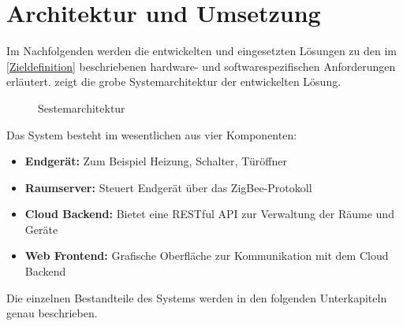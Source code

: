 \section{Architektur und Umsetzung}

Im Nachfolgenden werden die entwickelten und eingesetzten Lösungen zu den im \autoref{Zieldefinition} beschriebenen hardware- und softwarespezifischen Anforderungen erläutert.  zeigt
die grobe Systemarchitektur der entwickelten Lösung.


\begin{figure}[htb]
\centering
{}
\caption{Sestemarchitektur}
\label{fig:DD}
\end{figure}

Das System besteht im wesentlichen aus vier Komponenten:

\begin{itemize}
\item \textbf{Endgerät:} Zum Beispiel Heizung, Schalter, Türöffner
\item \textbf{Raumserver:} Steuert Endgerät über das ZigBee-Protokoll
\item \textbf{Cloud Backend:} Bietet eine RESTful API zur Verwaltung der Räume und Geräte
\item \textbf{Web Frontend:} Grafische Oberfläche zur Kommunikation mit dem Cloud Backend
\end{itemize}

Die einzelnen Bestandteile des Systems werden in den folgenden Unterkapiteln genau beschrieben. 










